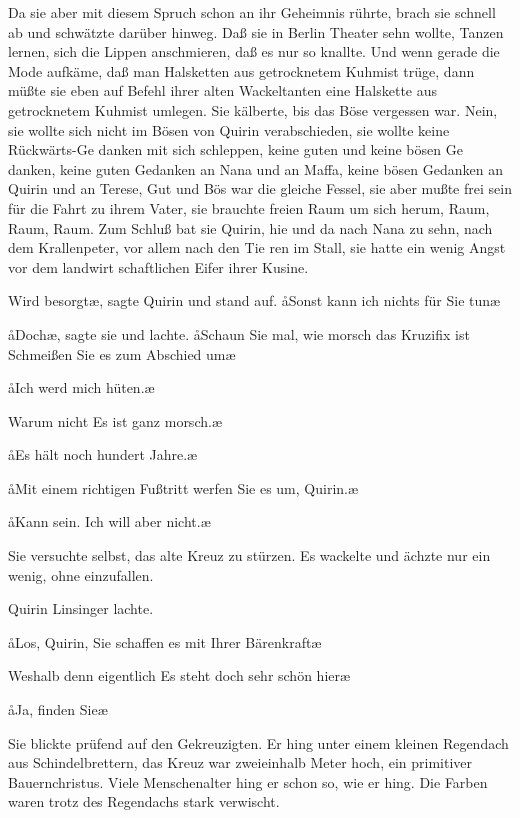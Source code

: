 Da sie aber mit diesem Spruch schon an ihr Geheimnis rührte,
brach sie schnell ab und schwätzte darüber hinweg. Daß sie in
Berlin Theater sehn wollte, Tanzen lernen, sich die Lippen
anschmieren, daß es nur so knallte. Und wenn gerade die Mode
aufkäme, daß man Halsketten aus getrocknetem Kuhmist trüge,
dann müßte sie eben auf Befehl ihrer alten Wackeltanten eine
Halskette aus getrocknetem Kuhmist umlegen. Sie kälberte,
bis das Böse vergessen war. Nein, sie wollte sich nicht im Bösen
von Quirin verabschieden, sie wollte keine Rückwärts-Ge\-%
danken mit sich schleppen, keine guten und keine bösen Ge\-%
danken, keine guten Gedanken an Nana und an Maffa, keine
bösen Gedanken an Quirin und an Terese, Gut und Bös war
die gleiche Fessel, sie aber mußte frei sein für die Fahrt zu
ihrem Vater, sie brauchte freien Raum um sich herum, Raum,
Raum, Raum. Zum Schluß bat sie Quirin, hie und da nach
Nana zu sehn, nach dem Krallenpeter, vor allem nach den Tie\-%
ren im Stall, sie hatte ein wenig Angst vor dem landwirt\-%
schaftlichen Eifer ihrer Kusine.

\aanah Wird besorgt\ae, sagte Quirin und stand auf. \aa Sonst kann ich
nichts für Sie tun\frag\ae

\aa Doch\ae, sagte sie und lachte. \aa Schaun Sie mal, wie morsch
das Kruzifix ist\ausr{} Schmeißen Sie es zum Abschied um\ausr\ae

\aa Ich werd mich hüten.\ae

\aanah Warum nicht\frag{} Es ist ganz morsch.\ae

\aa Es hält noch hundert Jahre.\ae

\aa Mit einem richtigen Fußtritt werfen Sie es um, Quirin.\ae

\aa Kann sein. Ich will aber nicht.\ae

Sie versuchte selbst, das alte Kreuz zu stürzen. Es wackelte
und ächzte nur ein wenig, ohne einzufallen.

Quirin Linsinger lachte.

\aa Los, Quirin, Sie schaffen es mit Ihrer Bärenkraft\ausr\ae

\aanah Weshalb denn eigentlich\frag{} Es steht doch sehr schön hier\frag\ae

\aa Ja, finden Sie\frag\ae

Sie blickte prüfend auf den Gekreuzigten. Er hing unter einem
kleinen Regendach aus Schindelbrettern, das Kreuz war
zweieinhalb Meter hoch, ein primitiver Bauernchristus. Viele
Menschenalter hing er schon so, wie er hing. Die Farben
waren trotz des Regendachs stark verwischt.

